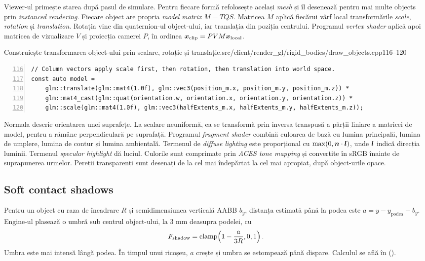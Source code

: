 \documentclass[11pt,a4paper]{article}
\begin{document}
Viewer-ul primește starea după pasul de simulare. Pentru
fiecare formă refolosește același \emph{mesh} și îl desenează pentru mai multe objects prin \emph{instanced rendering}. Fiecare object are propria \emph{model matrix}
\(M=TQS\). Matricea \(M\) aplică fiecărui vârf local
transformările \emph{scale}, \emph{rotation} și \emph{translation}.
Rotația vine din quaternion-ul object-ului, iar translația din
poziția centrului. Programul \emph{vertex shader} aplică apoi matricea
de vizualizare \(V\) și proiecția camerei \(P\), în ordinea
\(\boldsymbol{x}_{\mathrm{clip}}=PVM\boldsymbol{x}_{\mathrm{local}}\).
\begin{codefragment}{Construiește transformarea object-ului prin scalare, rotație și translație.}{src/client/render_gl/rigid_bodies/draw_objects.cpp}{116--120}
\begin{lstlisting}[numbers=left,firstnumber=116]
// Column vectors apply scale first, then rotation, then translation into world space.
const auto model =
    glm::translate(glm::mat4(1.0f), glm::vec3(position_m.x, position_m.y, position_m.z)) *
    glm::mat4_cast(glm::quat(orientation.w, orientation.x, orientation.y, orientation.z)) *
    glm::scale(glm::mat4(1.0f), glm::vec3(halfExtents_m.x, halfExtents_m.y, halfExtents_m.z));
\end{lstlisting}
\end{codefragment}

Normala descrie orientarea unei suprafețe. La scalare
neuniformă, ea se transformă prin inversa transpusă a
părții liniare a matricei de model, pentru a rămâne
perpendiculară pe suprafață. Programul \emph{fragment shader} combină
culoarea de bază cu lumina principală, lumina de umplere,
lumina de contur și lumina ambientală. Termenul de \emph{diffuse lighting} este proporțional cu \(\max(0,\boldsymbol{n}\cdot\boldsymbol{l})\), unde
\(\boldsymbol{l}\) indică direcția luminii. Termenul \emph{specular highlight} dă luciul. Culorile sunt comprimate prin \emph{ACES tone mapping} și convertite
în sRGB înainte de suprapunerea urmelor. Pereții
transparenți sunt desenați de la cel mai îndepărtat
la cel mai apropiat, după object-urile opace.

\subsection{Soft contact shadows}

Pentru un object cu raza de încadrare \(R\) și semidimensiunea
verticală AABB \(b_y\), distanța estimată până la podea este
\(a=y-y_{\mathrm{podea}}-b_y\). Engine-ul plasează o umbră
sub centrul object-ului, la 3 mm deasupra podelei, cu
\begin{equation}
F_{\mathrm{shadow}}=\operatorname{clamp}\!\left(1-\frac{a}{3R},0,1\right).
\end{equation}
Umbra este mai intensă lângă podea. În timpul unui
ricoșeu, \(a\) crește și umbra se estompează până dispare.
Calculul se află în 
().
\end{document}
